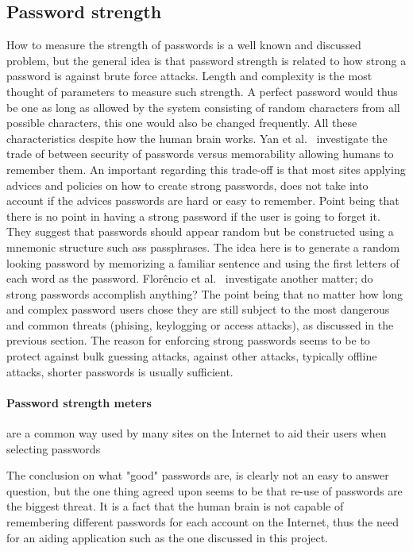 \subsection{Password strength}\label{password-strength}
How to measure the strength of passwords is a well known and discussed problem, but the general idea is that password strength is related to how strong a password is against brute force attacks. Length and complexity is the most thought of parameters to measure such strength. A perfect password would thus be one as long as allowed by the system consisting of random characters from all possible characters, this one would also be changed frequently. All these characteristics despite how the human brain works. Yan et al.~\cite{memorability_yan} investigate the trade of between security of passwords versus memorability allowing humans to remember them. An important regarding this trade-off is that most sites applying advices and policies on how to create strong passwords, does not take into account if the advices passwords are hard or easy to remember. Point being that there is no point in having a strong password if the user is going to forget it. They suggest that passwords should appear random but be constructed using a  mnemonic structure such ass passphrases. The idea here is to generate a random looking password by memorizing a familiar sentence and using the first letters of each word as the password. Florêncio et al.~\cite{strong-pws_florencio} investigate another matter; do strong passwords accomplish anything? The point being that no matter how long and complex password users chose they are still subject to the most dangerous and common threats (phising, keylogging or access attacks), as discussed in the previous section. The reason for enforcing strong passwords seems to be to protect against bulk guessing attacks, against other attacks, typically offline attacks, shorter passwords is usually sufficient. 
\paragraph{Password strength meters} are a common way used by many sites on the Internet to aid their users when selecting passwords

The conclusion on what "good" passwords are, is clearly not an easy to answer question, but the one thing agreed upon seems to be that re-use of passwords are the biggest threat. It is a fact that the human brain is not capable of remembering different passwords for each account on the Internet, thus the need for an aiding application such as the one discussed in this project.



